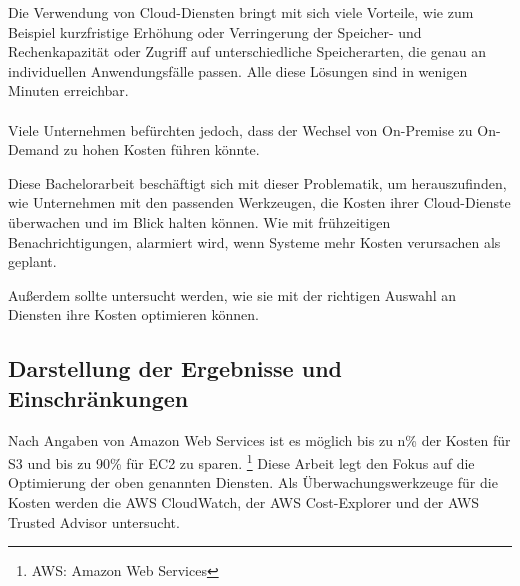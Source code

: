 \begin{comment}
\\\\
”Heute hatten wir 17 Gäste für unsere derzeit 20 Zimmer. Für die kommende Messe am Wochenende sind wir bereit 500 Gäste zu empfangen. Nach der Messe werden wir mit unseren üblichen 20 Zimmern wie immer gut arbeiten können.”
Normalerweise bräuchte man eine große Investition zu machen, um solche kurzfristige Nachfrage zu erfüllen. Vergleichbar ist es bei traditionellen IT-Infrastrukturen, mehr Kapazitätsbedarf, würde die Anschaffung von einer neuen Hardware bedeuten.
\\\\
\end{comment}
Die Verwendung von Cloud-Diensten bringt mit sich viele Vorteile, wie zum Beispiel kurzfristige Erhöhung oder Verringerung der Speicher- und Rechenkapazität oder Zugriff auf unterschiedliche Speicherarten, die genau an individuellen Anwendungsfälle passen. Alle diese Lösungen sind in wenigen Minuten erreichbar. 
\\\\
Viele Unternehmen befürchten jedoch, dass der Wechsel von On-Premise zu On-Demand zu hohen Kosten führen könnte.

\begin{flushleft}
Diese Bachelorarbeit beschäftigt sich mit dieser Problematik, um herauszufinden, wie Unternehmen mit den passenden Werkzeugen, die Kosten ihrer Cloud-Dienste überwachen und im Blick halten können. 
Wie mit frühzeitigen Benachrichtigungen, alarmiert wird, wenn Systeme mehr Kosten verursachen als geplant.
\end{flushleft}

Außerdem sollte untersucht werden, wie sie mit der richtigen Auswahl an Diensten ihre Kosten optimieren können.

\subsection{Darstellung der Ergebnisse und Einschränkungen}
Nach Angaben von Amazon Web Services ist es möglich bis zu n\% der Kosten für S3 und bis zu 90\% für EC2 zu sparen.
\footnote{AWS: Amazon Web Services} 
Diese Arbeit legt den Fokus auf die Optimierung der oben genannten Diensten.
Als Überwachungswerkzeuge für die Kosten werden die AWS CloudWatch, der AWS Cost-Explorer und der AWS Trusted Advisor untersucht. 


